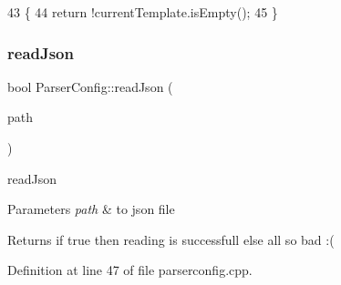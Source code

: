 \begin{DoxyCode}
43 \{
44     \textcolor{keywordflow}{return} !currentTemplate.isEmpty();
45 \}
\end{DoxyCode}
\mbox{\label{class_parser_config_af0029e03ae57af23c7f85393635ecb56}} 
\subsubsection{\texorpdfstring{read\+Json}{readJson}}
{\footnotesize\ttfamily bool Parser\+Config\+::read\+Json (\begin{DoxyParamCaption}\item[{Q\+String}]{path }\end{DoxyParamCaption})\hspace{0.3cm}{\ttfamily [slot]}}



read\+Json 


\begin{DoxyParams}{Parameters}
{\em path} & to json file \\
\hline
\end{DoxyParams}
\begin{DoxyReturn}{Returns}
if true then reading is successfull else all so bad \+:( 
\end{DoxyReturn}


Definition at line 47 of file parserconfig.\+cpp.


